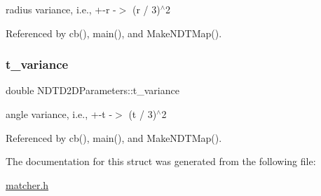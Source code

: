 radius variance, i.\+e., +-\/r -\/$>$ (r / 3)$^\wedge$2 

Referenced by cb(), main(), and Make\+N\+D\+T\+Map().

\mbox{\label{structNDTD2DParameters_a6fb531efcfe8f77c2bf003034094b544}} 
\subsubsection{\texorpdfstring{t\+\_\+variance}{t\_variance}}
{\footnotesize\ttfamily double N\+D\+T\+D2\+D\+Parameters\+::t\+\_\+variance}

angle variance, i.\+e., +-\/t -\/$>$ (t / 3)$^\wedge$2 

Referenced by cb(), main(), and Make\+N\+D\+T\+Map().



The documentation for this struct was generated from the following file\+:\begin{DoxyCompactItemize}
\item 
\hyperlink{matcher_8h}{matcher.\+h}\end{DoxyCompactItemize}
